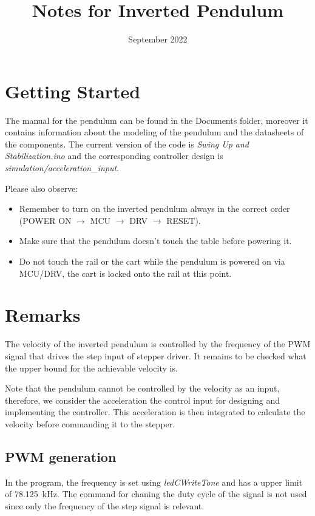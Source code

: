 \documentclass{article}
\title{Notes for Inverted Pendulum}
\date{September 2022}
\begin{document}
\maketitle

\section{Getting Started}

The manual for the pendulum can be found in the Documents folder, moreover it contains information about the modeling of the pendulum and the datasheets of the components.
The current version of the code is \textit{Swing Up and Stabilization.ino} and the corresponding controller design is \textit{simulation/acceleration\_input}.

Please also observe: 

\begin{itemize}
  \item Remember to turn on the inverted pendulum always in the correct order (POWER ON $\rightarrow$ MCU $\rightarrow$ DRV $\rightarrow$ RESET).
  \item Make sure that the pendulum doesn't touch the table before powering it.
  \item Do not touch the rail or the cart while the pendulum is powered on via MCU/DRV, the cart is locked onto the rail at this point.
\end{itemize}

\section{Remarks}
The velocity of the inverted pendulum is controlled by the frequency of the PWM signal that drives the step input of stepper driver. It remains to be checked what the upper bound for the achievable velocity is.

Note that the pendulum cannot be controlled by the velocity as an input, therefore, we consider the acceleration the control input for designing and implementing the controller. This acceleration is then integrated to calculate the velocity before commanding it to the stepper.


\subsection{PWM generation}
In the program, the frequency is set using \textit{ledCWriteTone} and has a upper limit of \SI{78.125}{\kilo\hertz}. The command for chaning the duty cycle of the signal is not used since only the frequency of the step signal is relevant.
\end{document}
